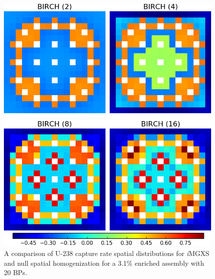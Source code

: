 \begin{figure}[h!]
\centering
\includegraphics[width=0.9\linewidth]{figures/results/compare/assm-31-20BPs/compare-capt}
\vspace{2mm}
\caption[U-238 capture rate comparison for a 3.1\% enriched assembly with 20 BPs]{A comparison of U-238 capture rate spatial distributions for \textit{i}\ac{MGXS} and null spatial homogenization for a 3.1\% enriched assembly with 20 \acp{BP}.}
\label{fig:chap11-assm-31-20BPs-capt-rates-comp}
\end{figure}
	
\clearpage

